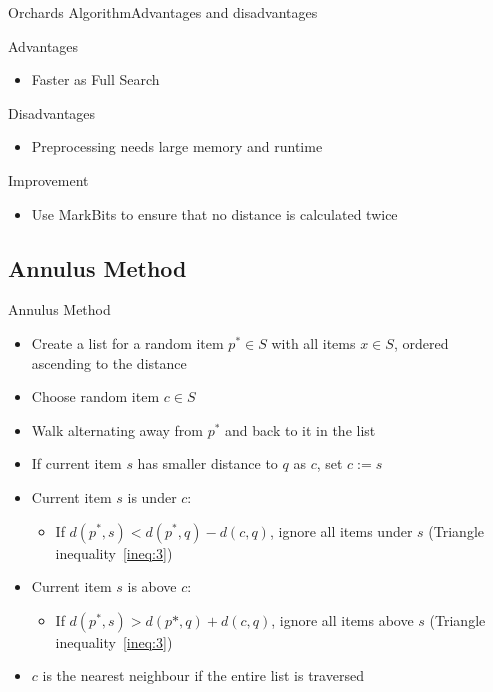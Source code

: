 \documentclass[handout]{beamer}
\begin{document}
\begin{frame}{Orchards Algorithm}{Advantages and disadvantages}
 \begin{block}{Advantages}
  \begin{itemize}
   \item Faster as Full Search
  \end{itemize}
 \end{block}
 \pause
 \begin{block}{Disadvantages}
  \begin{itemize}
   \item Preprocessing needs large memory and runtime
  \end{itemize}
 \end{block}
 \pause
 \begin{block}{Improvement}
  \begin{itemize}
   \item Use MarkBits to ensure that no distance is calculated twice
  \end{itemize}
 \end{block}
\end{frame}

\subsection{Annulus Method}
\begin{frame}{Annulus Method}
 \begin{itemize}
  \item Create a list for a random item $p^* \in S$ with all items $x \in S$, ordered ascending to the distance
  \pause
  \item Choose random item $c \in S$
  \pause
  \item Walk alternating away from $p^*$ and back to it in the list
  \pause
  \item If current item $s$ has smaller distance to $q$ as $c$, set $c:= s$
  \pause
  \item Current item $s$ is under $c$:
  \begin{itemize}
   \item If $d(p^*, s) < d(p^*, q) - d(c, q)$, ignore all items under $s$ (Triangle inequality~\ref{ineq:3})
  \end{itemize}
  \pause
  \item Current item $s$ is above $c$:
  \begin{itemize}
   \item If $d(p^*, s) > d(p*, q) + d(c, q)$, ignore all items above $s$ (Triangle inequality~\ref{ineq:3})
  \end{itemize}
  \pause
  \item $c$ is the nearest neighbour if the entire list is traversed
 \end{itemize}
\end{frame}
\end{document}
